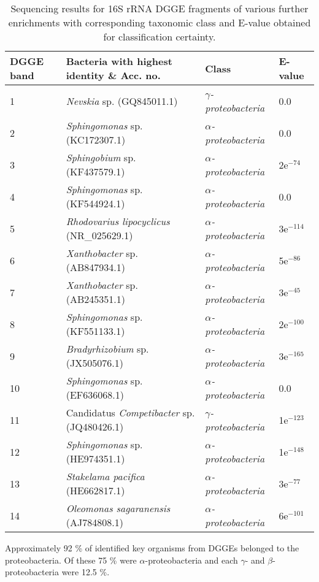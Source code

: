 \documentclass[11pt]{article}
\begin{document}
\begin{table}
\caption{Sequencing results for 16S rRNA DGGE fragments of various further enrichments with corresponding taxonomic class and E-value obtained for classification certainty.}
\begin{tabular}{ | l | p{7.8cm} | p{3cm} | l | }
\hline
DGGE band & Bacteria with highest identity \& Acc. no. & Class & E-value \\
\hline
1 & \emph{Nevskia} sp. (GQ845011.1) & \emph{$\gamma$-proteobacteria} & 0.0  \\
\hline
2 & \emph{Sphingomonas} sp. (KC172307.1) & \emph{$\alpha$-proteobacteria} & 0.0 \\
\hline
3 & \emph{Sphingobium} sp. (KF437579.1) & \emph{$\alpha$-proteobacteria} & 2e$^{-74}$ \\
\hline
4 & \emph{Sphingomonas} sp. (KF544924.1) & \emph{$\alpha$-proteobacteria} & 0.0  \\
\hline
5 & \emph{Rhodovarius lipocyclicus} (NR\_025629.1) & \emph{$\alpha$-proteobacteria} & 3e$^{-114}$ \\
\hline
6 & \emph{Xanthobacter} sp. (AB847934.1) & \emph{$\alpha$-proteobacteria} & 5e$^{-86}$  \\
\hline
7 & \emph{Xanthobacter} sp. (AB245351.1) & \emph{$\alpha$-proteobacteria} & 3e$^{-45}$  \\
\hline
8 & \emph{Sphingomonas} sp.(KF551133.1) & \emph{$\alpha$-proteobacteria} & 2e$^{-100}$  \\
\hline
9 & \emph{Bradyrhizobium} sp. (JX505076.1) & \emph{$\alpha$-proteobacteria} & 3e$^{-165}$  \\
\hline
10 & \emph{Sphingomonas} sp. (EF636068.1) & \emph{$\alpha$-proteobacteria} & 0.0  \\
\hline
11 & Candidatus \emph{Competibacter} sp. (JQ480426.1) & \emph{$\gamma$-proteobacteria} & 1e$^{-123}$  \\
\hline
12 & \emph{Sphingomonas} sp. (HE974351.1) & \emph{$\alpha$-proteobacteria} &  1e$^{-148}$ \\
\hline
13 & \emph{Stakelama pacifica} (HE662817.1) & \emph{$\alpha$-proteobacteria} & 3e$^{-77}$  \\
\hline
14 & \emph{Oleomonas sagaranensis} (AJ784808.1) & \emph{$\alpha$-proteobacteria} & 6e$^{-101}$  \\
\hline
\end{tabular}

\end{table}
\FloatBarrier
Approximately 92 \% of identified key organisms from DGGEs belonged to the proteobacteria. Of these 75 \% were \emph{$\alpha$}-proteobacteria  and each \emph{$\gamma$}- and \emph{$\beta$}- proteobacteria were 12.5 \%.
\end{document}
